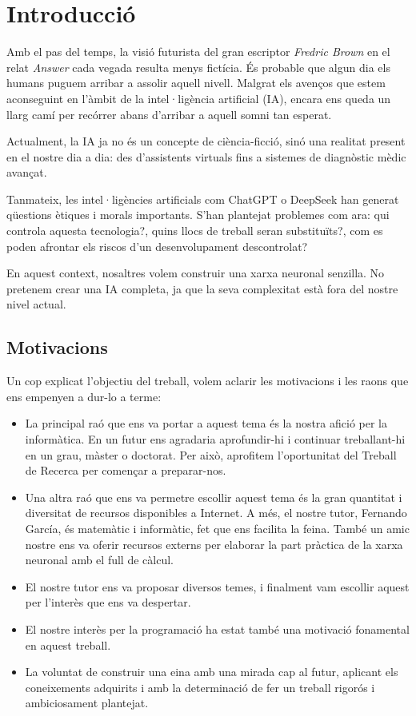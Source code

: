 \chapter{Introducció}
\label{c:intro}

Amb el pas del temps, la visió futurista del gran escriptor \textit{Fredric Brown} en el relat \emph{Answer} cada vegada resulta menys fictícia. És probable que algun dia els humans puguem arribar a assolir aquell nivell. Malgrat els avenços que estem aconseguint en l'àmbit de la intel·ligència artificial (IA), encara ens queda un llarg camí per recórrer abans d’arribar a aquell somni tan esperat.

Actualment, la IA ja no és un concepte de ciència-ficció, sinó una realitat present en el nostre dia a dia: des d’assistents virtuals fins a sistemes de diagnòstic mèdic avançat.

Tanmateix, les intel·ligències artificials com ChatGPT o DeepSeek han generat qüestions ètiques i morals importants. S’han plantejat problemes com ara: qui controla aquesta tecnologia?, quins llocs de treball seran substituïts?, com es poden afrontar els riscos d’un desenvolupament descontrolat?

En aquest context, nosaltres volem construir una xarxa neuronal senzilla. No pretenem crear una IA completa, ja que la seva complexitat està fora del nostre  nivel actual.

\section{Motivacions}
Un cop explicat l’objectiu del treball, volem aclarir les motivacions i les raons que ens empenyen a dur-lo a terme:

\begin{itemize}
 \item La principal raó que ens va portar a aquest tema és la nostra afició per la informàtica. En un futur ens agradaria aprofundir-hi i continuar treballant-hi en un grau, màster o doctorat. Per això, aprofitem l’oportunitat del Treball de Recerca per començar a preparar-nos.

 \item Una altra raó que ens va permetre escollir aquest tema és la gran quantitat i diversitat de recursos disponibles a Internet. A més, el nostre tutor, Fernando García, és matemàtic i informàtic, fet que ens facilita la feina. També un amic nostre ens va oferir recursos externs per elaborar la part pràctica de la xarxa neuronal amb el full de càlcul.

 \item El nostre tutor ens va proposar diversos temes, i finalment vam escollir aquest per l’interès que ens va despertar.

 \item El nostre interès per la programació ha estat també una motivació fonamental en aquest treball.

 \item La voluntat de construir una eina amb una mirada cap al futur, aplicant els coneixements adquirits i amb la determinació de fer un treball rigorós i ambiciosament plantejat.
\end{itemize}

